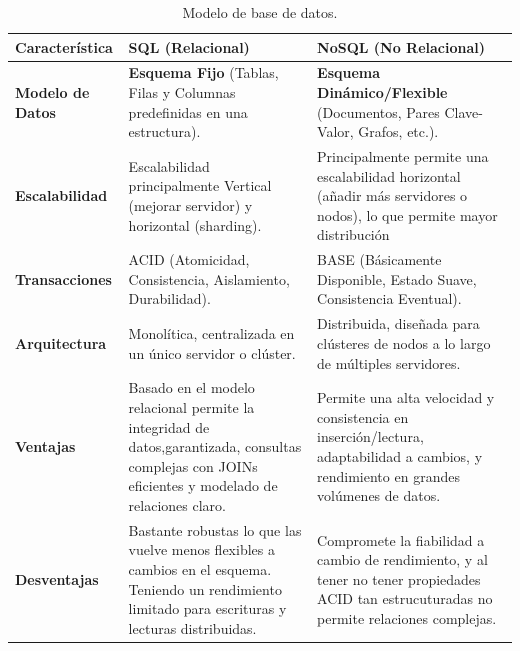 \begingroup
\setlength{\tabcolsep}{6pt} %
\renewcommand{\arraystretch}{1.5} %

\begin{longtable}{|p{3.5cm}|p{5.5cm}|p{5.4cm}|}
\caption{Modelo de base de datos.}
\label{tab:modelodb} \\
\hline
\textbf{Característica} & \textbf{SQL (Relacional)}\cite{Oppel2011} & \textbf{NoSQL (No Relacional)}\cite{Gomez} \\
\hline
\textbf{Modelo de Datos} & \textbf{Esquema Fijo} (Tablas, Filas y Columnas predefinidas en una estructura). & \textbf{Esquema Dinámico/Flexible} (Documentos, Pares Clave-Valor, Grafos, etc.). \\
\hline
\textbf{Escalabilidad} & Escalabilidad  principalmente Vertical (mejorar servidor) y horizontal (sharding). & Principalmente permite una escalabilidad horizontal (añadir más servidores o nodos), lo que permite mayor distribución \\
\hline
\textbf{Transacciones } & ACID (Atomicidad, Consistencia, Aislamiento, Durabilidad). & BASE (Básicamente Disponible, Estado Suave, Consistencia Eventual). \\
\hline
\textbf{Arquitectura} & Monolítica, centralizada en un único servidor o clúster. & Distribuida, diseñada para clústeres de nodos a lo largo de múltiples servidores. \\
\hline
\textbf{Ventajas} & Basado en el modelo relacional permite la integridad de datos,garantizada, consultas complejas con JOINs eficientes y modelado de relaciones claro. & Permite una alta velocidad y consistencia en inserción/lectura, adaptabilidad a cambios, y rendimiento en grandes volúmenes de datos. \\
\hline
\textbf{Desventajas} & Bastante robustas lo que las vuelve menos flexibles a cambios en el esquema. Teniendo un rendimiento limitado para escrituras y lecturas distribuidas. & Compromete la fiabilidad a cambio de rendimiento, y al tener no tener propiedades ACID tan estrucuturadas no permite relaciones complejas. \\
\hline
\end{longtable}
\endgroup


